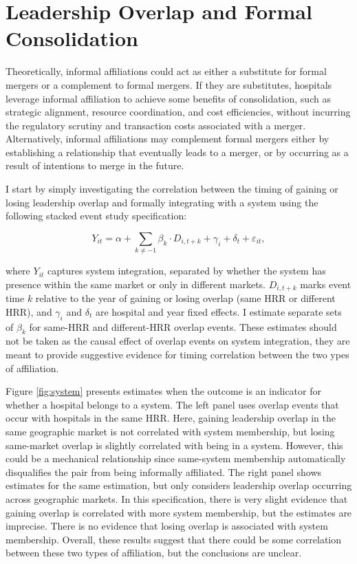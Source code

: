 \documentclass[12pt]{article}
\begin{document}
    \section{Leadership Overlap and Formal Consolidation}\label{sec:consolidation}


     Theoretically, informal affiliations could act as either a substitute for formal mergers or a complement to formal mergers. If they are substitutes, hospitals leverage informal affiliation to achieve some benefits of consolidation, such as strategic alignment, resource coordination, and cost efficiencies, without incurring the regulatory scrutiny and transaction costs associated with a merger. Alternatively, informal affiliations may complement formal mergers either by establishing a relationship that eventually leads to a merger, or by occurring as a result of intentions to merge in the future.

    I start by simply investigating the correlation between the timing of gaining or losing leadership overlap and formally integrating with a system using the following stacked event study specification: 
    
    \begin{equation}\label{eq:consolidation}
    Y_{it} = \alpha + \sum_{k \neq -1} \beta_k \cdot D_{i,t+k} + \gamma_i + \delta_t + \varepsilon_{it},
    \end{equation}

    where $Y_{it}$ captures system integration, separated by whether the system has presence within the same market or only in different markets. $D_{i,t+k}$ marks event time $k$ relative to the year of gaining or losing overlap (same HRR or different HRR), and $\gamma_i$ and $\delta_t$ are hospital and year fixed effects. I estimate separate sets of $\beta_k$ for same-HRR and different-HRR overlap events. These estimates should not be taken as the causal effect of overlap events on system integration, they are meant to provide suggestive evidence for timing correlation between the two ypes of affiliation. 

Figure \ref{fig:system} presents estimates when the outcome is an indicator for whether a hospital belongs to a system. The left panel uses overlap events that occur with hospitals in the same HRR. Here, gaining leadership overlap in the same geographic market is not correlated with system membership, but losing same-market overlap is slightly correlated with being in a system. However, this could be a mechanical relationship since same-system membership automatically disqualifies the pair from being informally affiliated. The right panel shows estimates for the same estimation, but only considers leadership overlap occurring across geographic markets. In this specification, there is very slight evidence that gaining overlap is correlated with more system membership, but the estimates are imprecise. There is no evidence that losing overlap is associated with system membership. Overall, these results suggest that there could be some correlation between these two types of affiliation, but the conclusions are unclear. 
\end{document}
